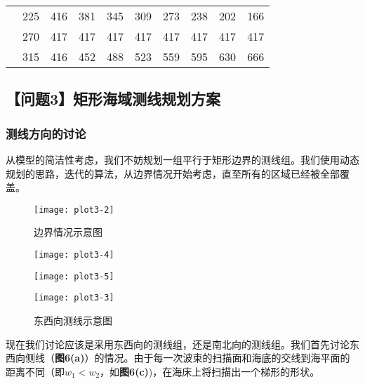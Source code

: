 \documentclass{cumcmthesis}
\begin{document}
\begin{table}[!h]
\begin{tabular}{|lc|cccccccc|}
\multicolumn{1}{|l|}{}                          & 225 & \multicolumn{1}{c|}{416} & \multicolumn{1}{c|}{381} & \multicolumn{1}{c|}{345} & \multicolumn{1}{c|}{309} & \multicolumn{1}{c|}{273} & \multicolumn{1}{c|}{238} & \multicolumn{1}{c|}{202} & 166 \\ \cline{2-10} 
\multicolumn{1}{|l|}{}                          & 270 & \multicolumn{1}{c|}{417} & \multicolumn{1}{c|}{417} & \multicolumn{1}{c|}{417} & \multicolumn{1}{c|}{417} & \multicolumn{1}{c|}{417} & \multicolumn{1}{c|}{417} & \multicolumn{1}{c|}{417} & 417 \\ \cline{2-10} 
\multicolumn{1}{|l|}{}                          & 315 & \multicolumn{1}{c|}{416} & \multicolumn{1}{c|}{452} & \multicolumn{1}{c|}{488} & \multicolumn{1}{c|}{523} & \multicolumn{1}{c|}{559} & \multicolumn{1}{c|}{595} & \multicolumn{1}{c|}{630} & 666 \\ \hline
\end{tabular}
\end{table}



\newpage
\subsection{【问题3】矩形海域测线规划方案}
\subsubsection{测线方向的讨论}
从模型的简洁性考虑，我们不妨规划一组平行于矩形边界的测线组。我们使用动态规划的思路，迭代的算法，从边界情况开始考虑，直至所有的区域已经被全部覆盖。
\begin{figure}[!h]
    \centering
    \texttt{[image: plot3-2]}
    \caption{边界情况示意图}
    \label{fig:result1}
\end{figure}
\begin{figure}
    \centering
    \begin{minipage}[c]{0.4\textwidth}
        \centering
        \texttt{[image: plot3-4]}
    \end{minipage}
    \begin{minipage}[c]{0.4\textwidth}
        \centering
        \texttt{[image: plot3-5]}
    \end{minipage}
    \begin{minipage}[c]{0.4\textwidth}
        \centering
        \texttt{[image: plot3-3]}
    \end{minipage}
    \caption{东西向测线示意图}
\end{figure}
现在我们讨论应该是采用东西向的测线组，还是南北向的测线组。我们首先讨论东西向侧线（\textbf{图6(a)}）的情况。由于每一次波束的扫描面和海底的交线到海平面的距离不同（即$w_1<w_2$，如\textbf{图6(c)})，在海床上将扫描出一个梯形的形状。
\end{document}
